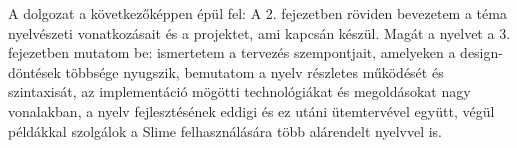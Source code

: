 A dolgozat a következőképpen épül fel: A 2. fejezetben röviden bevezetem a téma nyelvészeti vonatkozásait és a projektet, ami kapcsán készül. Magát a nyelvet a 3. fejezetben mutatom be: ismertetem a tervezés szempontjait, amelyeken a design-döntések többsége nyugszik, bemutatom a nyelv részletes működését és szintaxisát, az implementáció mögötti technológiákat és megoldásokat nagy vonalakban, a nyelv fejlesztésének eddigi és ez utáni ütemtervével együtt, végül példákkal szolgálok a Slime felhasználására több alárendelt nyelvvel is.